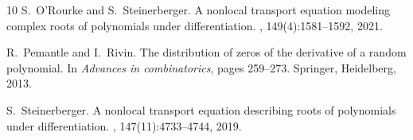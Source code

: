 \documentclass[11pt]{amsart}
\begin{document}
\begin{thebibliography}{10}
S.~O’Rourke and S.~Steinerberger.
\newblock A nonlocal transport equation modeling complex roots of polynomials under differentiation.
, 149(4):1581--1592, 2021.

R.~Pemantle and I.~Rivin.
\newblock The distribution of zeros of the derivative of a random polynomial.
\newblock In {\em Advances in combinatorics}, pages 259--273. Springer, Heidelberg, 2013.

S.~Steinerberger.
\newblock A nonlocal transport equation describing roots of polynomials under differentiation.
, 147(11):4733--4744, 2019.

\end{thebibliography}
\end{document}
